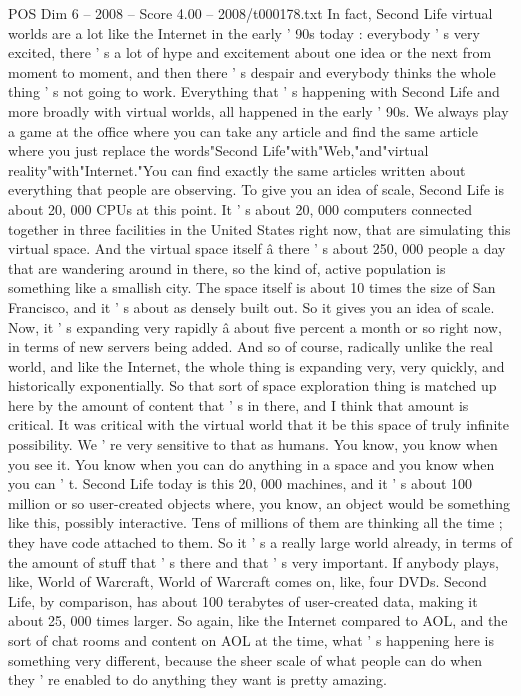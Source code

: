 \begin{textsample}{POS Dim 6 – 2008 – Score 4.00 – 2008/t000178.txt}
In fact, Second Life virtual worlds are a lot like the Internet in the early ' 90s today : everybody ' s very excited, there ' s a lot of hype and excitement about one idea or the next from moment to moment, and then there ' s despair and everybody thinks the whole thing ' s not going to work.
Everything that ' s happening with Second Life and more broadly with virtual worlds, all happened in the early ' 90s.
We always play a game at the office where you can take any article and find the same article where you just replace the words"Second Life"with"Web,"and"virtual reality"with"Internet."You can find exactly the same articles written about everything that people are observing.
To give you an idea of scale, Second Life is about 20, 000 CPUs at this point.
It ' s about 20, 000 computers connected together in three facilities in the United States right now, that are simulating this virtual space.
And the virtual space itself â there ' s about 250, 000 people a day that are wandering around in there, so the kind of, active population is something like a smallish city.
The space itself is about 10 times the size of San Francisco, and it ' s about as densely built out.
So it gives you an idea of scale.
Now, it ' s expanding very rapidly â about five percent a month or so right now, in terms of new servers being added.
And so of course, radically unlike the real world, and like the Internet, the whole thing is expanding very, very quickly, and historically exponentially.
So that sort of space exploration thing is matched up here by the amount of content that ' s in there, and I think that amount is critical.
It was critical with the virtual world that it be this space of truly infinite possibility.
We ' re very sensitive to that as humans.
You know, you know when you see it.
You know when you can do anything in a space and you know when you can ' t.
Second Life today is this 20, 000 machines, and it ' s about 100 million or so user-created objects where, you know, an object would be something like this, possibly interactive.
Tens of millions of them are thinking all the time ; they have code attached to them.
So it ' s a really large world already, in terms of the amount of stuff that ' s there and that ' s very important.
If anybody plays, like, World of Warcraft, World of Warcraft comes on, like, four DVDs.
Second Life, by comparison, has about 100 terabytes of user-created data, making it about 25, 000 times larger.
So again, like the Internet compared to AOL, and the sort of chat rooms and content on AOL at the time, what ' s happening here is something very different, because the sheer scale of what people can do when they ' re enabled to do anything they want is pretty amazing.

\end{textsample}
